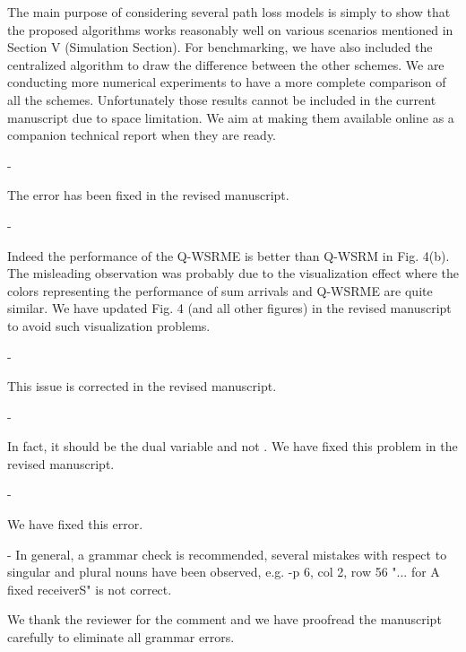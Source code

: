 \begin{enumerate}
\begin{enumerate}
	\resp The main purpose of considering several path loss models is simply to show that the proposed algorithms works reasonably well on various scenarios mentioned in Section V (Simulation Section). For benchmarking, we have also included the centralized algorithm to draw the difference between the other schemes. We are conducting more numerical experiments to have a more complete comparison of all the schemes. Unfortunately those results cannot be included in the current manuscript due to space limitation. We aim at making them available online as a companion technical report when they are ready.
	
	 - 
	
	\resp The error has been fixed in the revised manuscript.
	
	 - 
	
	\resp Indeed the performance of the Q-WSRME is better than Q-WSRM in Fig. 4(b). The misleading observation was probably due to the visualization effect where the colors representing the performance of sum arrivals and Q-WSRME are quite similar. We have updated Fig. 4 (and all other figures) in the revised manuscript to avoid such visualization problems.
	
	 - 
	
	\resp This issue is corrected in the revised manuscript.
	
	 - 
	
	\resp In fact, it should be the dual variable  and not . We have fixed this problem in the revised manuscript.
	
	 - 	
	
	\resp We have fixed this error.
	
	 - {In general, a grammar check is recommended, several mistakes with respect to singular and plural nouns have been observed, e.g. -p 6, col 2, row 56 "... for A fixed receiverS" is not correct.}
	
	\resp We thank the reviewer for the comment and we have proofread the manuscript carefully to eliminate all grammar errors.
	
\end{enumerate}

\end{enumerate}

